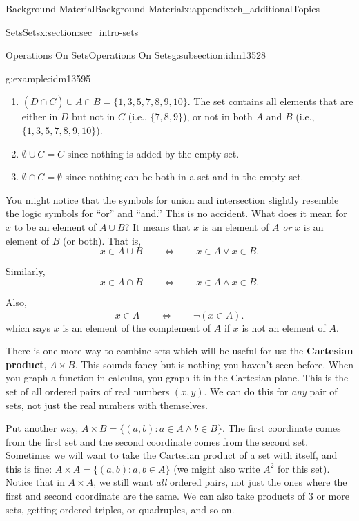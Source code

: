 \documentclass[oneside,10pt,]{book}
\newcommand{\terminology}[1]{\textbf{#1}}
\numberwithin{equation}{chapter}
\def\st{:}
\def\Iff{\Leftrightarrow}
\begin{document}
\begin{appendixptx}{Background Material}{}{Background Material}{}{}{x:appendix:ch_additionalTopics}
\begin{sectionptx}{Sets}{}{Sets}{}{}{x:section:sec_intro-sets}
\begin{subsectionptx}{Operations On Sets}{}{Operations On Sets}{}{}{g:subsection:idm13528}
\begin{example}{}{g:example:idm13595}
\begin{enumerate}
\item{}\((D \cap \overline C) \cup \overline{A \cap B} = \{1, 3, 5, 7, 8, 9, 10\}.\) The set contains all elements that are either in \(D\) but not in \(C\) (i.e., \(\{7,8,9\}\)), or not in both \(A\) and \(B\) (i.e., \(\{1,3,5,7,8,9,10\}\)).%
\item{}\(\emptyset \cup C = C\) since nothing is added by the empty set.%
\item{}\(\emptyset \cap C = \emptyset\) since nothing can be both in a set and in the empty set.%
\end{enumerate}
%
\end{example}
You might notice that the symbols for union and intersection slightly resemble the logic symbols for ``or'' and ``and.'' This is no accident. What does it mean for \(x\) to be an element of \(A\cup B\)? It means that \(x\) is an element of \(A\) \emph{or} \(x\) is an element of \(B\) (or both). That is,%
\begin{equation*}
x \in A \cup B \qquad \Iff \qquad x \in A \vee x \in B.
\end{equation*}
%
\par
Similarly,%
\begin{equation*}
x \in A \cap B \qquad \Iff \qquad x \in A \wedge x \in B.
\end{equation*}
%
\par
Also,%
\begin{equation*}
x \in \overline A \qquad \Iff \qquad \neg (x \in A).
\end{equation*}
which says \(x\) is an element of the complement of \(A\) if \(x\) is not an element of \(A\).%
\par
There is one more way to combine sets which will be useful for us: the \terminology{Cartesian product}, \(A \times B\)\label{g:notation:idm13685}. This sounds fancy but is nothing you haven't seen before. When you graph a function in calculus, you graph it in the Cartesian plane. This is the set of all ordered pairs of real numbers \((x,y)\). We can do this for \emph{any} pair of sets, not just the real numbers with themselves.%
\par
Put another way, \(A \times B = \{(a,b) \st a \in A \wedge b \in B\}\). The first coordinate comes from the first set and the second coordinate comes from the second set. Sometimes we will want to take the Cartesian product of a set with itself, and this is fine: \(A \times A = \{(a,b) \st a, b \in A\}\) (we might also write \(A^2\) for this set). Notice that in \(A \times A\), we still want \emph{all} ordered pairs, not just the ones where the first and second coordinate are the same. We can also take products of 3 or more sets, getting ordered triples, or quadruples, and so on.%

\end{subsectionptx}
\end{sectionptx}
\end{appendixptx}
\end{document}
